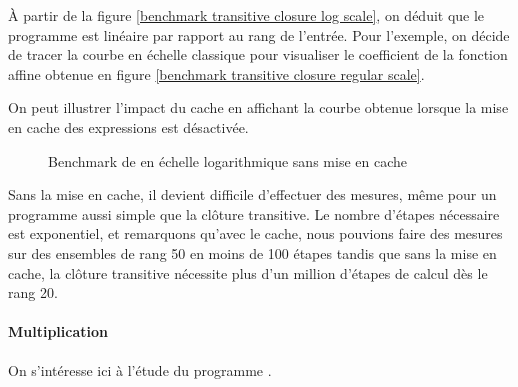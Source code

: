 \documentclass[a4paper, 11pt]{article}
\begin{document}
\`{A} partir de la figure \ref{benchmark transitive closure log scale}, on déduit que le programme
 est linéaire par rapport au rang de l'entrée. Pour l'exemple, on décide de tracer la courbe
en échelle classique pour visualiser le coefficient de la fonction affine obtenue en figure
\ref{benchmark transitive closure regular scale}.

On peut illustrer l'impact du cache en affichant la courbe obtenue lorsque la mise en cache 
des expressions est désactivée.

\begin{figure}[H]
        \begin{center}
        \end{center}
        \caption{Benchmark de \protect{} en échelle logarithmique sans mise en cache}
        \label{benchmark transitive closure log scale no cache}
\end{figure}

Sans la mise en cache, il devient difficile d'effectuer des mesures, même pour un programme 
aussi simple que la clôture transitive. 
Le nombre d'étapes nécessaire est exponentiel, et remarquons qu'avec le cache, nous pouvions
faire des mesures sur des ensembles de rang 50 en moins de 100 étapes tandis que sans la mise en cache,
la clôture transitive nécessite plus d'un million d'étapes de calcul dès le rang 20.

\paragraph{Multiplication}

On s'intéresse ici à l'étude du programme .
\end{document}
